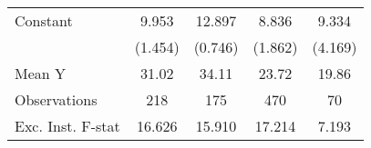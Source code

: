 {\begin{tabular}{l*{4}{c}}
\addlinespace
Constant            &       9.953\sym{***}&      12.897\sym{***}&       8.836\sym{***}&       9.334\sym{**} \\
                    &     (1.454)         &     (0.746)         &     (1.862)         &     (4.169)         \\
\midrule
Mean Y              &       31.02         &       34.11         &       23.72         &       19.86         \\
Observations        &         218         &         175         &         470         &          70         \\
Exc. Inst. F-stat   &      16.626         &      15.910         &      17.214         &       7.193         \\
\bottomrule
\end{tabular}
}
